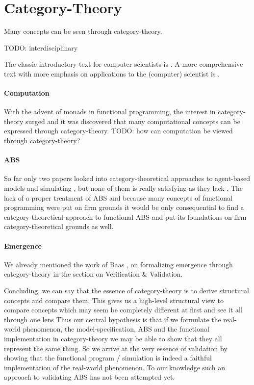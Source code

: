 \section{Category-Theory}
Many concepts can be seen through category-theory. 

TODO: interdisciplinary \cite{baez_physics_2009}

The classic introductory text for computer scientists is \cite{pierce_basic_1991}. A more comprehensive text with more emphasis on applications to the (computer) scientist is \cite{spivak_category_2014}.

\paragraph{Computation}
With the advent of monads in functional programming, the interest in category-theory surged and it was discovered that many computational concepts can be expressed through category-theory.  TODO: how can computation be viewed through category-theory?

\paragraph{ABS}
So far only two papers looked into category-theoretical approaches to agent-based models and simulating \cite{beheshti_analyzing_2013}, \cite{lloyd_category-theoretic_2010} but none of them is really satisfying as they lack . The lack of a proper treatment of ABS and because many concepts of functional programming were put on firm grounds it would be only consequential to find a category-theoretical approach to functional ABS and put its foundations on firm category-theoretical grounds as well.

\paragraph{Emergence}
We already mentioned the work of Baas \cite{baas_emergence_1994}, \cite{baas_emergence_1997} on formalizing emergence through category-theory in the section on Verification \& Validation.

Concluding, we can say that the essence of category-theory is to derive structural concepts and compare them. This gives us a high-level structural view to compare concepts which may seem be completely different at first and see it all through one lens
Thus our central hypothesis is that if we formulate the real-world phenomenon, the model-specification, ABS and the functional implementation in category-theory we may be able to show that they all represent the same thing. So we arrive at the  very essence of validation by showing that the functional program / simulation is indeed a faithful implementation of the real-world phenomenon. To our knowledge such an approach to validating ABS has not been attempted yet.